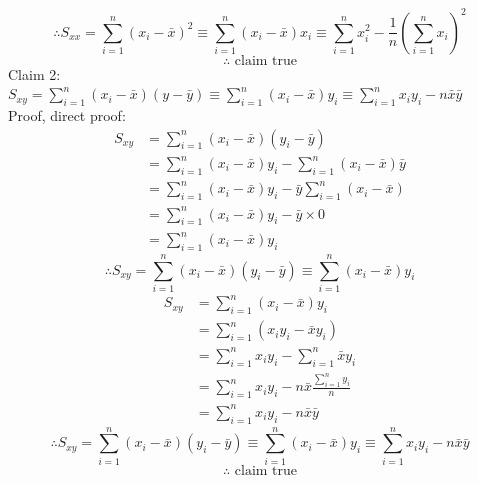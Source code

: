 \documentclass[a4paper]{article}
\begin{document}
			\[\therefore S_{xx} = \sum_{i=1}^n(x_i-\bar{x})^2 \equiv \sum_{i=1}^n(x_i-\bar{x})x_i \equiv \sum_{i=1}^n x_i^2 - \frac{1}{n}\left(\sum_{i=1}^nx_i\right)^2\]
			\[\therefore \text{ claim true}\]
		Claim 2: \(S_{xy} = \sum_{i=1}^n(x_i-\bar{x})(y-\bar{y}) \equiv \sum_{i=1}^n (x_i - \bar{x})y_i \equiv \sum_{i=1}^nx_iy_i - n\bar{x}\bar{y}\)\\
		Proof, direct proof:
			\begin{equation*}
				\begin{split}
					S_{xy} &= \sum_{i=1}^n(x_i-\bar{x})(y_i-\bar{y})\\
					&= \sum_{i=1}^n(x_i-\bar{x})y_i - \sum_{i=1}^n(x_i-\bar{x})\bar{y}\\
					&= \sum_{i=1}^n(x_i-\bar{x})y_i - \bar{y}\sum_{i=1}^n(x_i-\bar{x})\\
					&= \sum_{i=1}^n(x_i-\bar{x})y_i - \bar{y} \times 0\\
					&= \sum_{i=1}^n(x_i-\bar{x})y_i
				\end{split}
			\end{equation*}
			\[\therefore S_{xy} = \sum_{i=1}^n(x_i-\bar{x})(y_i-\bar{y}) \equiv \sum_{i=1}^n(x_i-\bar{x})y_i\]
			\begin{equation*}
				\begin{split}
					S_{xy} &= \sum_{i=1}^n(x_i-\bar{x})y_i\\
					&= \sum_{i=1}^n \left(x_iy_i - \bar{x}y_i\right)\\
					&= \sum_{i=1}^n x_iy_i - \sum_{i=1}^n \bar{x}y_i\\
					&= \sum_{i=1}^n x_iy_i - n\bar{x}\frac{\sum_{i=1}^n y_i}{n}\\
					&= \sum_{i=1}^n x_iy_i - n\bar{x}\bar{y}
				\end{split}
			\end{equation*}
			\[\therefore S_{xy} = \sum_{i=1}^n(x_i-\bar{x})(y_i-\bar{y}) \equiv \sum_{i=1}^n (x_i - \bar{x})y_i \equiv \sum_{i=1}^nx_iy_i - n\bar{x}\bar{y}\]
			\[\therefore \text{ claim true}\]
\end{document}
